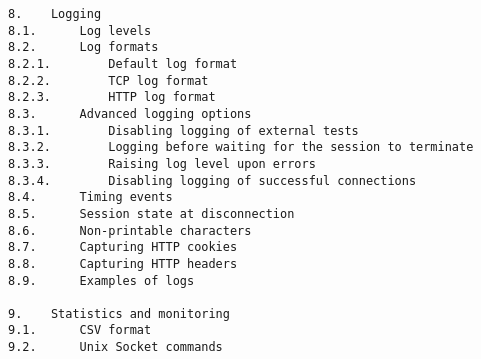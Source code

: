 \begin{verbatim}
8.    Logging
8.1.      Log levels
8.2.      Log formats
8.2.1.        Default log format
8.2.2.        TCP log format
8.2.3.        HTTP log format
8.3.      Advanced logging options
8.3.1.        Disabling logging of external tests
8.3.2.        Logging before waiting for the session to terminate
8.3.3.        Raising log level upon errors
8.3.4.        Disabling logging of successful connections
8.4.      Timing events
8.5.      Session state at disconnection
8.6.      Non-printable characters
8.7.      Capturing HTTP cookies
8.8.      Capturing HTTP headers
8.9.      Examples of logs

9.    Statistics and monitoring
9.1.      CSV format
9.2.      Unix Socket commands


\end{verbatim}

